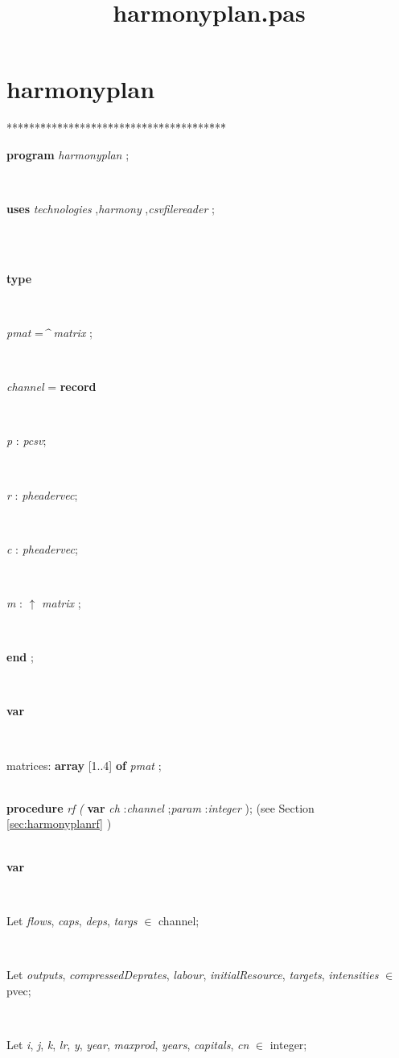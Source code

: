 \documentclass[10pt, a4paper]{article}
\title{harmonyplan.pas}
\begin{document}
\maketitle

\tableofcontents
\section{harmonyplan}
\begin{tabbing}
***\=***\=***\=***\=***\=***\=***\=***\=***\=***\=***\=***\=***\=\kill
\parbox{14cm}{\textsf{\textbf{program}  \textit{harmonyplan} ;}}\\
\+\parbox{14cm}{\textsf{\textbf{uses}   \textit{technologies} ,\textit{harmony} ,\textit{csvfilereader} ;}}\\
\\
\<\parbox{14cm}{\textsf{\textbf{type} }}\\
\parbox{14cm}{\textsf{\textit{pmat} =\textit{\^{}} \textit{matrix} ;}}\\
\+\parbox{14cm}{\textsf{\textit{channel} = \textbf{record} }}\\
\parbox{14cm}{\textsf{\textit{p} : \textit{pcsv}}; }\\
\parbox{14cm}{\textsf{\textit{r} : \textit{pheadervec}}; }\\
\parbox{14cm}{\textsf{\textit{c} : \textit{pheadervec}}; }\\
\parbox{14cm}{\textsf{\textit{m} : $\uparrow$ \textit{matrix} }; }\\
\<\-\parbox{14cm}{\textsf{\textbf{end} ;}}\\
\<\parbox{14cm}{\textsf{\textbf{var} }}\\
\parbox{14cm}{matrices: \textbf{ array } \textsf{[1..4] } \textbf{ of } \textsf{ \textit{pmat} ;}}\\
\<\textsf{\textbf{procedure}  \textit{rf} \textit{(} \textbf{var}  \textit{ch} :\textit{channel} ;\textit{param} :\textit{integer}  );} (see Section \ref{sec:harmonyplanrf} )\\
\\
\<\parbox{14cm}{\textsf{\textbf{var} }}\\
\parbox{14cm}{\textsf{Let \textit{flows}, \textit{caps}, \textit{deps}, \textit{targs} $\in$ channel;}}\\
\parbox{14cm}{\textsf{Let \textit{outputs}, \textit{compressedDeprates}, \textit{labour}, \textit{initialResource}, \textit{targets}, \textit{intensities} $\in$ pvec;}}\\
\parbox{14cm}{\textsf{Let \textit{i}, \textit{j}, \textit{k}, \textit{lr}, \textit{y}, \textit{year}, \textit{maxprod}, \textit{years}, \textit{capitals}, \textit{cn} $\in$ integer;}}\\

\end{tabbing}
\end{document}
